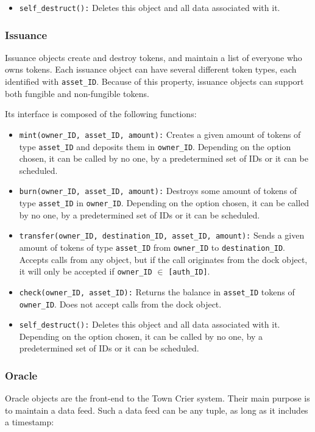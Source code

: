 \documentclass[conference]{IEEEtran}
\begin{document}
\begin{itemize}
	\item \texttt{self\_destruct():} Deletes this object and all data associated with it.
\end{itemize}

\subsubsection{Issuance} \label{issuance}
Issuance objects create and destroy tokens, and maintain a list of everyone who owns tokens. Each issuance object can have several different token types, each identified with \texttt{asset\_ID}. Because of this property, issuance objects can support both fungible and non-fungible tokens.

Its interface is composed of the following functions:

\begin{itemize}
	\item \texttt{mint(owner\_ID, asset\_ID, amount):} Creates a given amount of tokens of type \texttt{asset\_ID} and deposits them in \texttt{owner\_ID}. Depending on the option chosen, it can be called by no one, by a predetermined set of IDs or it can be scheduled.
	\item \texttt{burn(owner\_ID, asset\_ID, amount):} Destroys some amount of tokens of type \texttt{asset\_ID} in \texttt{owner\_ID}. Depending on the option chosen, it can be called by no one, by a predetermined set of IDs or it can be scheduled.
	\item \texttt{transfer(owner\_ID, destination\_ID, asset\_ID, amount):} Sends a given amount of tokens of type \texttt{asset\_ID} from \texttt{owner\_ID} to \texttt{destination\_ID}. Accepts calls from any object, but if the call originates from the dock object, it will only be accepted if \texttt{owner\_ID} $\in$ \texttt{[auth\_ID]}.
	\item \texttt{check(owner\_ID, asset\_ID):} Returns the balance in \texttt{asset\_ID} tokens of \texttt{owner\_ID}. Does not accept calls from the dock object.
	\item \texttt{self\_destruct():} Deletes this object and all data associated with it. Depending on the option chosen, it can be called by no one, by a predetermined set of IDs or it can be scheduled.
\end{itemize}

\subsubsection{Oracle}
Oracle objects are the front-end to the Town Crier system. Their main purpose is to maintain a data feed. Such a data feed can be any tuple, as long as it includes a timestamp:
\end{document}
